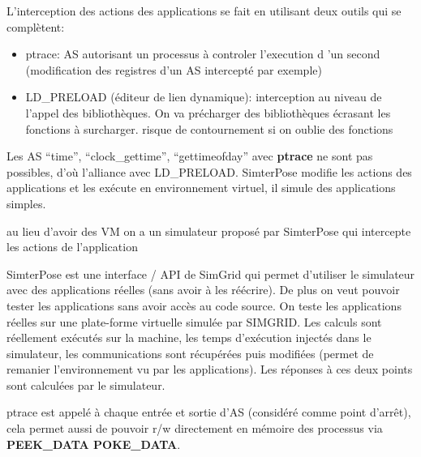 \documentclass{article}
\begin{document}
L'interception des actions des applications se fait en utilisant deux outils qui
se complètent:
\begin{itemize}
\item ptrace: AS autorisant un processus à controler l'execution d 'un second
  (modification des registres d'un AS intercepté par exemple)
\item LD\_PRELOAD (éditeur de lien dynamique): interception au niveau de l'appel
  des bibliothèques. On va précharger des bibliothèques écrasant les fonctions à
  surcharger. {\color{red} risque de contournement si on oublie des fonctions}
\end{itemize}

Les AS ``time'', ``clock\_gettime'', ``gettimeofday'' avec \textbf{ptrace} ne
sont pas possibles, d'où l'alliance avec LD\_PRELOAD.  SimterPose modifie les
actions des applications et les exécute en environnement virtuel, il simule des
applications simples.

{\color{green} au lieu d'avoir des VM on a un simulateur proposé par SimterPose
  qui intercepte les actions de l'application}

SimterPose est une interface / API de SimGrid qui permet d'utiliser le
simulateur avec des applications réelles (sans avoir à les réécrire). De plus on
veut pouvoir tester les applications sans avoir accès au code source. On teste
les applications réelles sur une plate-forme virtuelle simulée par SIMGRID. Les
calculs sont réellement exécutés sur la machine, les temps d'exécution injectés
dans le simulateur, les communications sont récupérées puis modifiées (permet de
remanier l'environnement vu par les applications). Les réponses à ces deux
points sont calculées par le simulateur.

ptrace est appelé à chaque entrée et sortie d'AS (considéré comme point
d'arrêt), cela permet aussi de pouvoir r/w directement en mémoire des processus
via \textbf{PEEK\_DATA POKE\_DATA}.
\end{document}
